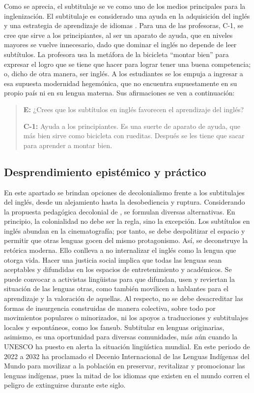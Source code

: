 \documentclass[spanish]{textolivre}
\newenvironment{MyQuote}{%
    \begin{myQuoteEnumerate}[resume=*,series=MyQuoteSeries]%
    \item \begin{quote}%
}{%
    \end{quote}%
    \end{myQuoteEnumerate}%
}%
\begin{document}
Como se aprecia, el subtitulaje se ve como uno de los medios principales para la inglenización. El subtitulaje es considerado una ayuda en la adquisición del inglés y una estrategia de aprendizaje de idiomas \cite{jude2019subtitulacion}. Para una de las profesoras, C-1, se cree que sirve a los principiantes, al ser un aparato de ayuda, que en niveles mayores se vuelve innecesario, dado que dominar el inglés no depende de leer subtítulos. La profesora usa la metáfora de la bicicleta “montar bien” para expresar el logro que se tiene que hacer para lograr tener una buena competencia; o, dicho de otra manera, ser inglés. A los estudiantes se los empuja a ingresar a esa supuesta modernidad hegemónica, que no encuentra supuestamente en su propio país ni en su lengua materna. Sus afirmaciones se ven a continuación:

\begin{MyQuote}\label{myquote07}
\textbf{E:} ¿Crees que los subtítulos en inglés favorecen el aprendizaje del inglés?

\textbf{C-1:} Ayuda a los principiantes. Es una suerte de aparato de ayuda, que más bien sirve como bicicleta con rueditas. Después se les tiene que sacar para aprender a montar bien.
\end{MyQuote}



\subsection{Desprendimiento epistémico y práctico}
En este apartado se brindan opciones de decolonialismo frente a los subtitulajes del inglés, desde un alejamiento hasta la desobediencia y ruptura. Considerando la propuesta pedagógica decolonial de \textcite{baum2019decir}, se formulan diversas alternativas. En principio, la colonialidad no debe ser la regla, sino la excepción. Los subtítulos en inglés abundan en la cinematografía; por tanto, se debe despolitizar el espacio y permitir que otras lenguas gocen del mismo protagonismo. Así, se deconstruye la retórica moderna. Ello conlleva a no internalizar el inglés como la lengua que otorga vida. Hacer una justicia social implica que todas las lenguas sean aceptables y difundidas en los espacios de entretenimiento y académicos. Se puede convocar a activistas lingüistas para que difundan, usen y reviertan la situación de las lenguas otras, como también movilicen a hablantes para el aprendizaje y la valoración de aquellas. Al respecto, no se debe desacreditar las formas de insurgencia construidas de manera colectiva, sobre todo por movimientos populares o minorizados, ni los apoyos a traducciones y subtitulajes locales y espontáneos, como los fansub. Subtitular en lenguas originarias, asimismo, es una oportunidad para diversas comunidades, más aún cuando la UNESCO ha puesto en alerta la situación lingüística mundial. En este periodo de 2022 a 2032 ha proclamado el Decenio Internacional de las Lenguas Indígenas del Mundo para movilizar a la población en preservar, revitalizar y promocionar las lenguas indígenas, pues la mitad de los idiomas que existen en el mundo corren el peligro de extinguirse durante este siglo.
\end{document}
